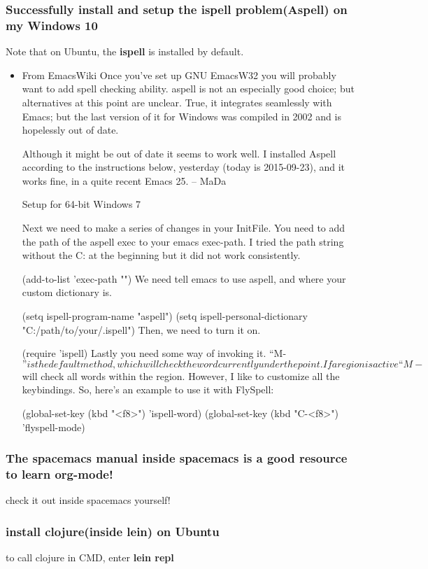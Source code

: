 \documentclass[11pt]{article}
\begin{document}
\subsubsection*{Successfully install and setup the \textbf{ispell} problem(Aspell) on my Windows 10}
\label{sec:orgheadline88}
Note that on Ubuntu, the \textbf{ispell} is installed by default.
\begin{itemize}
\item From EmacsWiki
\label{sec:orgheadline87}
Once you’ve set up GNU EmacsW32 you will probably want to add spell checking ability.  aspell is not an especially good choice; but alternatives at this point are unclear. True, it integrates seamlessly with Emacs; but the last version of it for Windows was compiled in 2002 and is hopelessly out of date.

Although it might be out of date it seems to work well. I installed Aspell according to the instructions below, yesterday (today is 2015-09-23), and it works fine, in a quite recent Emacs 25. – MaDa

Setup for 64-bit Windows 7

Next we need to make a series of changes in your InitFile.  You need to add the path of the aspell exec to your emacs exec-path.  I tried the path string without the C: at the beginning but it did not work consistently.

    (add-to-list 'exec-path "")
We need tell emacs to use aspell, and where your custom dictionary is.

    (setq ispell-program-name "aspell")
    (setq ispell-personal-dictionary "C:/path/to/your/.ispell")
Then, we need to turn it on.

    (require 'ispell)
Lastly you need some way of invoking it.  “M-\(” is the default method, which will check the word currently under the point.  If a region is active “M-\) will check all words within the region.  However, I like to customize all the keybindings.  So, here’s an example to use it with FlySpell:

(global-set-key (kbd "<f8>") 'ispell-word)
(global-set-key (kbd "C-<f8>") 'flyspell-mode)
\end{itemize}
\subsubsection*{The spacemacs manual \textbf{inside} spacemacs is a good resource to learn org-mode!}
\label{sec:orgheadline89}
check it out inside spacemacs yourself!
\subsubsection*{install clojure(inside \textbf{lein}) on Ubuntu}
\label{sec:orgheadline90}
to call clojure in CMD, enter \textbf{lein repl}
\end{document}
